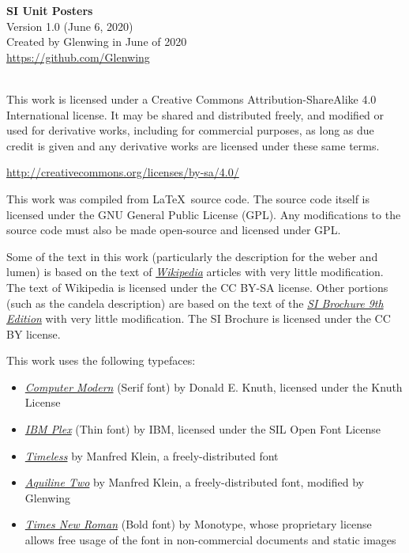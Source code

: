 \documentclass[a4paper]{article}
\renewcommand{\,}{\hspace{0.2em}} %
\begin{document}
\raggedbottom
\nopagecolor %

\thispagestyle{empty}

\begin{center}
	{\Large \textbf{SI Unit Posters}}\\
	\large
	Version 1.0 (June 6, 2020) \\
	Created by Glenwing in June of 2020\\
	\url{https://github.com/Glenwing}\\
	\vspace{1cm}
	\ccLogo~\ccAttribution~\ccShareAlike
	\vspace{1cm}
\end{center}

\setlength\lineskip{0.5em}
\setlength\parskip{1em}
This work is licensed under a Creative Commons Attribution-ShareAlike 4.0 International license. It may be shared and distributed freely, and modified or used for derivative works, including for commercial purposes, as long as due credit is given and any derivative works are licensed under these same terms.

\url{http://creativecommons.org/licenses/by-sa/4.0/}

This work was compiled from \LaTeX\ source code. The source code itself is licensed under the GNU General Public License (GPL). Any modifications to the source code must also be made open-source and licensed under GPL.

Some of the text in this work (particularly the description for the weber and lumen) is based on the text of \href{https://en.wikipedia.org/wiki/Main_Page}{\textsl{Wikipedia}} articles with very little modification. The text of Wikipedia is licensed under the CC BY-SA license. Other portions (such as the candela description) are based on the text of the \href{https://www.bipm.org/utils/common/pdf/si-brochure/SI-Brochure-9-EN.pdf}{\textsl{SI Brochure 9th Edition}} with very little modification. The SI Brochure is licensed under the CC BY license.

This work uses the following typefaces:
\begin{itemize}
\setlength\itemsep{0.25em}
\item{\textsl{\href{https://www.ctan.org/tex-archive/fonts/cm/}{Computer Modern}} (Serif font) by Donald E. Knuth, licensed under the Knuth License}
\item{\textsl{\href{https://github.com/IBM/plex}{IBM Plex}} (Thin font) by IBM, licensed under the SIL Open Font License}
\item{\textsl{\href{http://fontpro.com/timeless-font-5159}{Timeless}} by Manfred Klein, a freely-distributed font}
\item{\textsl{\href{http://fontpro.com/aquiline-two-font-3337}{Aquiline Two}} by Manfred Klein, a freely-distributed font, modified by Glenwing}
\item{\textsl{\href{https://catalog.monotype.com/font/monotype/times-new-roman/bold}{Times New Roman}} (Bold font) by Monotype, whose proprietary license allows free usage of the font in non-commercial documents and static images}
\end{itemize}
\end{document}
